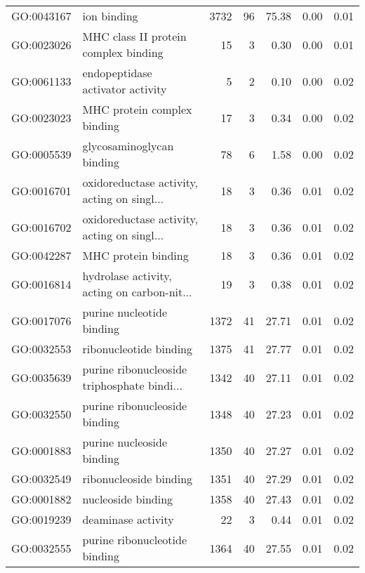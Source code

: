 \begin{table}[ht]
\begin{tabular}{llrrrrr}
  GO:0043167 & ion binding & 3732 &  96 & 75.38 & 0.00 & 0.01 \\ 
  GO:0023026 & MHC class II protein complex binding &  15 &   3 & 0.30 & 0.00 & 0.01 \\ 
  GO:0061133 & endopeptidase activator activity &   5 &   2 & 0.10 & 0.00 & 0.02 \\ 
  GO:0023023 & MHC protein complex binding &  17 &   3 & 0.34 & 0.00 & 0.02 \\ 
  GO:0005539 & glycosaminoglycan binding &  78 &   6 & 1.58 & 0.00 & 0.02 \\ 
  GO:0016701 & oxidoreductase activity, acting on singl... &  18 &   3 & 0.36 & 0.01 & 0.02 \\ 
  GO:0016702 & oxidoreductase activity, acting on singl... &  18 &   3 & 0.36 & 0.01 & 0.02 \\ 
  GO:0042287 & MHC protein binding &  18 &   3 & 0.36 & 0.01 & 0.02 \\ 
  GO:0016814 & hydrolase activity, acting on carbon-nit... &  19 &   3 & 0.38 & 0.01 & 0.02 \\ 
  GO:0017076 & purine nucleotide binding & 1372 &  41 & 27.71 & 0.01 & 0.02 \\ 
  GO:0032553 & ribonucleotide binding & 1375 &  41 & 27.77 & 0.01 & 0.02 \\ 
  GO:0035639 & purine ribonucleoside triphosphate bindi... & 1342 &  40 & 27.11 & 0.01 & 0.02 \\ 
  GO:0032550 & purine ribonucleoside binding & 1348 &  40 & 27.23 & 0.01 & 0.02 \\ 
  GO:0001883 & purine nucleoside binding & 1350 &  40 & 27.27 & 0.01 & 0.02 \\ 
  GO:0032549 & ribonucleoside binding & 1351 &  40 & 27.29 & 0.01 & 0.02 \\ 
  GO:0001882 & nucleoside binding & 1358 &  40 & 27.43 & 0.01 & 0.02 \\ 
  GO:0019239 & deaminase activity &  22 &   3 & 0.44 & 0.01 & 0.02 \\ 
  GO:0032555 & purine ribonucleotide binding & 1364 &  40 & 27.55 & 0.01 & 0.02 \\ 
   \hline
\end{tabular}
\end{table}
